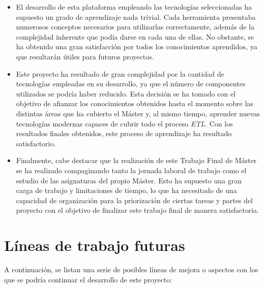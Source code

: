 \begin{itemize}
    \item El desarrollo de esta plataforma empleando las tecnologías seleccionadas ha supuesto un grado de aprendizaje nada trivial. Cada herramienta presentaba numerosos conceptos necesarios para utilizarlas correctamente, además de la complejidad inherente que podía darse en cada una de ellas. No obstante, se ha obtenido una gran satisfacción por todos los conocimientos aprendidos, ya que resultarán útiles para futuros proyectos.

    \item Este proyecto ha resultado de gran complejidad por la cantidad de tecnologías empleadas en su desarrollo, ya que el número de componentes utilizados se podría haber reducido. Esta decisión se ha tomado con el objetivo de afianzar los conocimientos obtenidos hasta el momento sobre las distintas áreas que ha cubierto el Máster y, al mismo tiempo, aprender nuevas tecnologías modernas capaces de cubrir todo el proceso \textit{ETL}. Con los resultados finales obtenidos, este proceso de aprendizaje ha resultado satisfactorio.

    \item Finalmente, cabe destacar que la realización de este Trabajo Final de Máster se ha realizado compaginando tanto la jornada laboral de trabajo como el estudio de las asignaturas del propio Máster. Esto ha supuesto una gran carga de trabajo y limitaciones de tiempo, lo que ha necesitado de una capacidad de organización para la priorización de ciertas tareas y partes del proyecto con el objetivo de finalizar este trabajo final de manera satisfactoria.

\end{itemize}

\section{Líneas de trabajo futuras}

A continuación, se listan una serie de posibles líneas de mejora o aspectos con los que se podría continuar el desarrollo de este proyecto:

